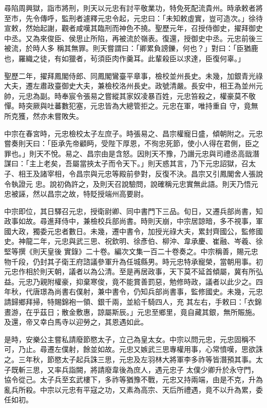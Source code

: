 \begin{pinyinscope}
 尋陷周興獄，詣市將刑，則天以元忠有討平敬業功，特免死配流貴州。時承敕者將至市，先令傳呼，監刑者遽釋元忠令起，元忠曰：「未知敕虛實，豈可造次。」徐待宣敕，然始起謝，觀者咸嘆其臨刑而神色不撓。聖歷元年，召授侍御史，擢拜御史中丞。又為來俊臣、侯思止所陷，再被流於嶺表。復還，授御史中丞。元忠前後三被流，於時人多
 稱其無罪。則天嘗謂曰：「卿累負謗鑠，何也？」對曰：「臣猶鹿也，羅織之徒，有如獵者，茍須臣肉作羹耳。此輩殺臣以求達，臣復何辜。」



 聖歷二年，擢拜鳳閣侍郎、同鳳閣鸞臺平章事，檢校並州長史。未幾，加銀青光祿大夫，遷左肅政臺御史大夫，兼檢校洛州長史。政號清嚴。長安中，相王為並州元帥，元忠為副。時奉宸令張易之嘗縱其家奴凌暴百姓，元忠笞殺之，權豪莫不敬憚。時突厥與吐蕃數犯塞，元忠皆為大總管拒之。元忠在軍，唯持重自
 守，竟無所克獲，然亦未嘗敗失。



 中宗在春宮時，元忠檢校太子左庶子。時張易之、昌宗權寵日盛，傾朝附之。元忠嘗奏則天曰：「臣承先帝顧眄，受陛下厚恩，不徇忠死節，使小人得在君側，臣之罪也。」則天不悅。易之、昌宗由是含怒。因則天不豫，乃譖元忠與司禮丞高戩潛謀曰：「主上老矣，吾屬當挾太子而令天下。」則天惑其言，乃下元忠詔獄，召太子、相王及諸宰相，令昌宗與元忠等殿前參對，反復不決。昌宗又引鳳閣舍人張說令執證元
 忠。說初偽許之，及則天召說驗問，說確稱元忠實無此語。則天乃悟元忠被誣，然以昌宗之故，特貶授端州高要尉。



 中宗即位，其日驛召元忠，授衛尉卿、同中書門下三品。旬日，又遷兵部尚書，知政事如故。尋進拜侍中，兼檢校兵部尚書。時則天崩，中宗居諒暗，多不視事，軍國大政，獨委元忠者數日。未幾，遷中書令，加授光祿大夫，累封齊國公，監修國史。神龍二年，元忠與武三思、祝欽明、徐彥伯、柳沖、韋承慶、崔融、岑羲、徐堅等撰《則天皇後
 實錄》二十卷。編次文集一百二十卷奏之。中宗稱善，賜元忠物千段，仍封其子衛王府諮議參軍升為任城縣男。時元忠特承寵榮，當朝用事。初元忠作相於則天朝，議者以為公清。至是再居政事，天下莫不延首傾屬，冀有所弘益。元忠乃親附權豪，抑棄寒俊，竟不能賞善罰惡，勉修時政，議者以此少之。四年秋，代唐璟為尚書右僕射，兼中書令，仍知兵部尚書事，監修國史。未幾，元忠請歸鄉拜掃，特賜錦袍一領、銀千兩，並給千騎四人，充
 其左右，手敕曰：「衣錦晝游，在乎茲日；散金敷惠，諒屬斯辰。」元忠至鄉里，竟自藏其銀，無所賑施。及還，帝又幸白馬寺以迎勞之，其恩遇如此。



 是時，安樂公主嘗私請廢節愍太子，立己為皇太女。中宗以問元忠，元忠固稱不可，乃止。尋遷左僕射，餘並如故。元忠又嫉武三思專權用事，心常憤嘆，思欲誅之。三年秋，節愍太子起兵誅三思，元忠及左羽林大將軍李多祚等皆潛預其事。太子既斬三思，又率兵詣闕，將請廢韋後為庶人，遇元忠子
 太僕少卿升於永守門，協令從己。太子兵至玄武樓下，多祚等猶豫不戰，元忠又持兩端，由是不克，升為亂兵所殺。中宗以元忠有平寇之功，又素為高宗、天后所禮遇，竟不以升為累，委任如初。




\end{pinyinscope}
